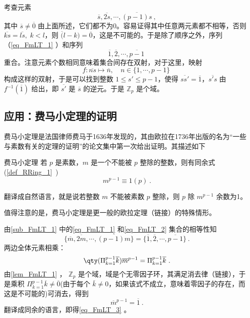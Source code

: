 考查元素 
\begin{equation}\label{eq_FmLT_1}
\overline s,\overline{2s},\cdots,\overline{(p-1)s}~,
\end{equation}
其中 $\overline s\not=\overline 0$ 由上面所述，它们都不为0。容易证得其中任意两元素都不相等，否则 $\overline{ks}=\overline{ls},\;k<l$，则 $\overline(l-k)=\overline 0$，这是不可能的。于是除了顺序之外，序列（\autoref{eq_FmLT_1} ）和序列
\begin{equation}\label{eq_FmLT_2}
\overline 1,\overline 2,\cdots,\overline{p-1}~
\end{equation}
重合。注意元素个数相同意味着集合间存在双射，对于这里，映射
\begin{equation}
f:\overline{ns}\mapsto \overline n,\quad n\in\{1,\cdots,p-1\}~
\end{equation}
构成这样的双射，于是可以找到整数 $1\leq s'\leq p-1$，使得 $\overline{ss'}=\overline 1$，$\overline{s's}$ 由 $f^{-1}(\overline 1)$ 给出，即 $\overline{s'}$ 是 $\overline s$ 的逆元。于是 $\mathbb Z_p$ 是个域。


\subsection{应用：费马小定理的证明}


费马小定理是法国律师费马于1636年发现的，其由欧拉在1736年出版的名为“一些与素数有关的定理的证明”的论文集中第一次给出证明。其描述如下
\begin{theorem}{费马小定理}\label{the_FmLT_1}
若 $p$ 是素数，$m$ 是一个不能被 $p$ 整除的整数，则有同余式(\autoref{def_RRing_1}~)
\begin{equation}\label{eq_FmLT_3}
m^{p-1}\equiv 1(p)~.
\end{equation}
\end{theorem}
翻译成自然语言，就是说若整数 $m$ 不能被素数 $p$ 整除，则 $p$ 除 $m^{p-1}$ 余数为1。

值得注意的是，费马小定理是更一般的欧拉定理（链接）的特殊情形。

由\autoref{sub_FmLT_1} 中的\autoref{eq_FmLT_1} 和\autoref{eq_FmLT_2} 集合的相等性知
\begin{equation}
\{\overline m,\overline{2m},\cdots,\overline{(p-1)m}\}=\{\overline 1,\overline 2,\cdots,\overline{p-1}\}~.
\end{equation}
两边全体元素相乘：
\begin{equation}
\qty(\Pi_{k=1}^{p-1}\overline k)\overline{m}^{p-1}=\Pi_{k=1}^{p-1}\overline k~.
\end{equation}
由\autoref{lem_FmLT_1} ， $\mathbb Z_p$ 是个域，域是个无零因子环，其满足消去律（链接），于是乘积 $\Pi_{k=1}^{p-1}\overline k\neq\overline0$(由于每个 $\bar k\neq0$，如果该式不成立，意味着零因子的存在，而这是不可能的)可消去，得到
\begin{equation}
\overline m^{p-1}=\overline 1~.
\end{equation}
翻译成同余的语言，即得\autoref{eq_FmLT_3} 。








